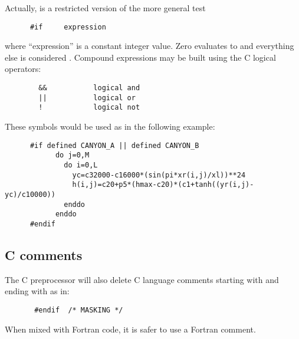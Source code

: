 Actually,  is a restricted version of the more general
test
\begin{verbatim}
      #if     expression
\end{verbatim}
where ``expression'' is a constant integer value.  Zero evaluates
to  and everything else is considered .
Compound expressions may be built using the C logical operators:
\begin{verbatim}
        &&           logical and
        ||           logical or
        !            logical not
\end{verbatim}
These symbols would be used as in the following example:
\begin{verbatim}
      #if defined CANYON_A || defined CANYON_B
            do j=0,M
              do i=0,L
                yc=c32000-c16000*(sin(pi*xr(i,j)/xl))**24
                h(i,j)=c20+p5*(hmax-c20)*(c1+tanh((yr(i,j)-yc)/c10000))
              enddo
            enddo
      #endif
\end{verbatim}

\subsection{C comments}
The C preprocessor will also delete C language comments starting
with \code{/*} and ending with \code{*/} as in:
\begin{verbatim}
       #endif  /* MASKING */
\end{verbatim}
When mixed with Fortran code, it is safer to use a Fortran
comment.

